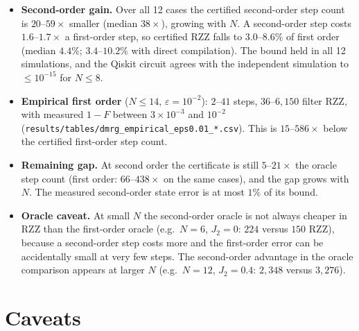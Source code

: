 \documentclass[11pt]{article}
\newcommand{\eps}{\varepsilon}
\begin{document}
\begin{itemize}
\item \textbf{Second-order gain.} Over all 12 cases the certified second-order step count is $20$--$59\times$ smaller
 (median $38\times$), growing with $N$. A second-order step costs $1.6$--$1.7\times$ a first-order step, so
 certified RZZ falls to $3.0$--$8.6\%$ of first order (median $4.4\%$; $3.4$--$10.2\%$ with direct compilation).
 The bound held in all 12 simulations, and the Qiskit circuit agrees with the independent simulation to
 $\le10^{-15}$ for $N\le8$.
\item \textbf{Empirical first order} ($N\le14$, $\eps=10^{-2}$): $2$--$41$ steps, $36$--$6{,}150$ filter RZZ, with
 measured $1-F$ between $3\times10^{-3}$ and $10^{-2}$ (\texttt{results/tables/dmrg\_empirical\_eps0.01\_*.csv}).
 This is $15$--$586\times$ below the certified first-order step count.
\item \textbf{Remaining gap.} At second order the certificate is still $5$--$21\times$ the oracle step count
 (first order: $66$--$438\times$ on the same cases), and the gap grows with $N$. The measured second-order state
 error is at most $1\%$ of its bound.
\item \textbf{Oracle caveat.} At small $N$ the second-order oracle is not always cheaper in RZZ than the first-order
 oracle (e.g.\ $N=6$, $J_2=0$: $224$ versus $150$ RZZ), because a second-order step costs more and the first-order
 error can be accidentally small at very few steps. The second-order advantage in the oracle comparison appears at
 larger $N$ (e.g.\ $N=12$, $J_2=0.4$: $2{,}348$ versus $3{,}276$).
\end{itemize}

\section{Caveats}
\end{document}
